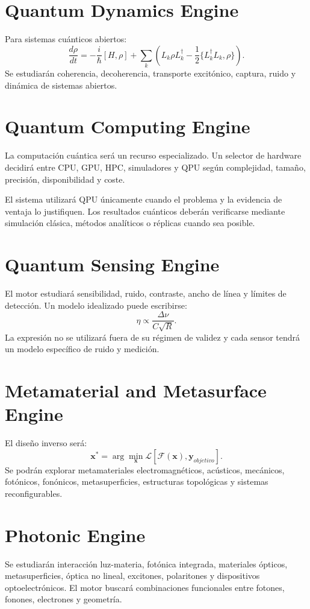 \documentclass[11pt,a4paper]{article}
\begin{document}
\section{Quantum Dynamics Engine}
Para sistemas cuánticos abiertos:
\[
\frac{d\rho}{dt}=-\frac{i}{\hbar}[H,\rho]+\sum_k\left(L_k\rho L_k^\dagger-\frac12\{L_k^\dagger L_k,\rho\}\right).
\]
Se estudiarán coherencia, decoherencia, transporte excitónico, captura, ruido y dinámica de sistemas abiertos.

\section{Quantum Computing Engine}
La computación cuántica será un recurso especializado. Un selector de hardware decidirá entre CPU, GPU, HPC, simuladores y QPU según complejidad, tamaño, precisión, disponibilidad y coste.

El sistema utilizará QPU únicamente cuando el problema y la evidencia de ventaja lo justifiquen. Los resultados cuánticos deberán verificarse mediante simulación clásica, métodos analíticos o réplicas cuando sea posible.

\section{Quantum Sensing Engine}
El motor estudiará sensibilidad, ruido, contraste, ancho de línea y límites de detección. Un modelo idealizado puede escribirse:
\[
\eta\propto\frac{\Delta\nu}{C\sqrt R}.
\]
La expresión no se utilizará fuera de su régimen de validez y cada sensor tendrá un modelo específico de ruido y medición.

\section{Metamaterial and Metasurface Engine}
El diseño inverso será:
\[
\mathbf x^*=\arg\min_\mathbf x \mathcal L[\mathcal F(\mathbf x),\mathbf y_{objetivo}].
\]
Se podrán explorar metamateriales electromagnéticos, acústicos, mecánicos, fotónicos, fonónicos, metasuperficies, estructuras topológicas y sistemas reconfigurables.

\section{Photonic Engine}
Se estudiarán interacción luz-materia, fotónica integrada, materiales ópticos, metasuperficies, óptica no lineal, excitones, polaritones y dispositivos optoelectrónicos. El motor buscará combinaciones funcionales entre fotones, fonones, electrones y geometría.
\end{document}
